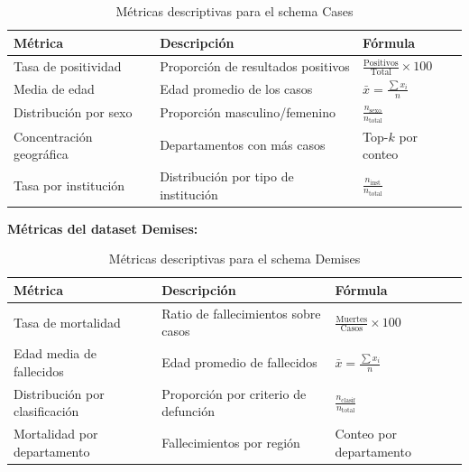 \documentclass[12pt,a4paper]{article}
\begin{document}
\begin{table}[H]
    \centering
    \caption{Métricas descriptivas para el schema Cases}
    \begin{tabular}{@{}lp{6cm}l@{}}
        \toprule
        \textbf{Métrica}         & \textbf{Descripción}                 & \textbf{Fórmula}                                   \\
        \midrule
        Tasa de positividad      & Proporción de resultados positivos   & $\frac{\text{Positivos}}{\text{Total}} \times 100$ \\[6pt]
        Media de edad            & Edad promedio de los casos           & $\bar{x} = \frac{\sum x_i}{n}$                     \\[6pt]
        Distribución por sexo    & Proporción masculino/femenino        & $\frac{n_{\text{sexo}}}{n_{\text{total}}}$         \\[6pt]
        Concentración geográfica & Departamentos con más casos          & Top-$k$ por conteo                                 \\[6pt]
        Tasa por institución     & Distribución por tipo de institución & $\frac{n_{\text{inst}}}{n_{\text{total}}}$         \\
        \bottomrule
    \end{tabular}
\end{table}

\textbf{Métricas del dataset Demises:}

\begin{table}[H]
    \centering
    \caption{Métricas descriptivas para el schema Demises}
    \begin{tabular}{@{}lp{6cm}l@{}}
        \toprule
        \textbf{Métrica}               & \textbf{Descripción}                 & \textbf{Fórmula}                                 \\
        \midrule
        Tasa de mortalidad             & Ratio de fallecimientos sobre casos  & $\frac{\text{Muertes}}{\text{Casos}} \times 100$ \\[6pt]
        Edad media de fallecidos       & Edad promedio de fallecidos          & $\bar{x} = \frac{\sum x_i}{n}$                   \\[6pt]
        Distribución por clasificación & Proporción por criterio de defunción & $\frac{n_{\text{clasif}}}{n_{\text{total}}}$     \\[6pt]
        Mortalidad por departamento    & Fallecimientos por región            & Conteo por departamento                          \\
        \bottomrule
    \end{tabular}
\end{table}
\end{document}
